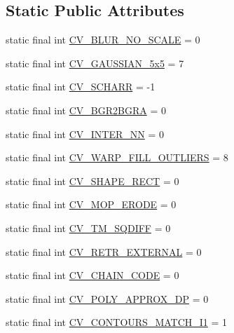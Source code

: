 \subsection*{Static Public Attributes}
\begin{DoxyCompactItemize}
\item 
static final int \hyperlink{group__imgproc__c_ga41b42253aaff66342934c5f37e1d2024}{C\+V\+\_\+\+B\+L\+U\+R\+\_\+\+N\+O\+\_\+\+S\+C\+A\+LE} = 0
\item 
static final int \hyperlink{group__imgproc__c_ga528289c1a7349496d926a9a2ddae3b51}{C\+V\+\_\+\+G\+A\+U\+S\+S\+I\+A\+N\+\_\+5x5} = 7
\item 
static final int \hyperlink{group__imgproc__c_gad680d8093fc7352b21881b08002d7698}{C\+V\+\_\+\+S\+C\+H\+A\+RR} = -\/1
\item 
static final int \hyperlink{group__imgproc__c_ga2a997fb46eb3c46bcb8c1a1af53baf03}{C\+V\+\_\+\+B\+G\+R2\+B\+G\+RA} = 0
\item 
static final int \hyperlink{group__imgproc__c_gabe5d6b644796472a88a9bc67bc7ec400}{C\+V\+\_\+\+I\+N\+T\+E\+R\+\_\+\+NN} = 0
\item 
static final int \hyperlink{group__imgproc__c_gab5f8b66bd10e5b45a6565b34cf8e490b}{C\+V\+\_\+\+W\+A\+R\+P\+\_\+\+F\+I\+L\+L\+\_\+\+O\+U\+T\+L\+I\+E\+RS} = 8
\item 
static final int \hyperlink{group__imgproc__c_gae9f68d923c5dff530693edea39e513af}{C\+V\+\_\+\+S\+H\+A\+P\+E\+\_\+\+R\+E\+CT} = 0
\item 
static final int \hyperlink{group__imgproc__c_gafa232583b0fa5354f919dc91623c4be9}{C\+V\+\_\+\+M\+O\+P\+\_\+\+E\+R\+O\+DE} = 0
\item 
static final int \hyperlink{group__imgproc__c_gacdf613bdd0296dad8c1c1e94fb42c93e}{C\+V\+\_\+\+T\+M\+\_\+\+S\+Q\+D\+I\+FF} = 0
\item 
static final int \hyperlink{group__imgproc__c_gae346e956c48bb671a642f55d8731797f}{C\+V\+\_\+\+R\+E\+T\+R\+\_\+\+E\+X\+T\+E\+R\+N\+AL} = 0
\item 
static final int \hyperlink{group__imgproc__c_ga805d058895793b75bdcfdfcf74cc6831}{C\+V\+\_\+\+C\+H\+A\+I\+N\+\_\+\+C\+O\+DE} = 0
\item 
static final int \hyperlink{group__imgproc__c_ga3508524a44f4fc55f4d5b4651dd27e0b}{C\+V\+\_\+\+P\+O\+L\+Y\+\_\+\+A\+P\+P\+R\+O\+X\+\_\+\+DP} = 0
\item 
static final int \hyperlink{group__imgproc__c_gacb3ea9232f2555aa0f32d0ac29c44414}{C\+V\+\_\+\+C\+O\+N\+T\+O\+U\+R\+S\+\_\+\+M\+A\+T\+C\+H\+\_\+\+I1} = 1

\end{DoxyCompactItemize}
